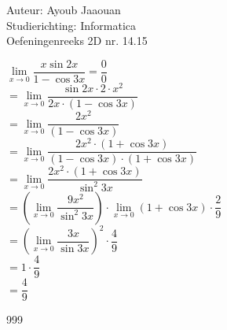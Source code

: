 \documentclass[a4paper]{article}
\begin{document}
\noindent \large Auteur: Ayoub Jaaouan \\
\noindent \large Studierichting: Informatica\\
\noindent \large Oefeningenreeks 2D nr. 14.15\\

\medskip

\normalsize

$\lim\limits_{x \to 0} \dfrac{x\sin 2 x}{1-\cos 3 x} = \dfrac{0}{0}$  \\


$ = \lim\limits_{x \to 0} \dfrac{\sin 2 x \cdot 2 \cdot x^2}{2x \cdot (1-\cos 3x)}$  \\

$ = \lim\limits_{x \to 0} \dfrac{2x^2 }{ (1-\cos 3x)}$  \\

$ = \lim\limits_{x \to 0} \dfrac{2x^2\cdot(1+\cos 3x) }{ (1-\cos 3x)\cdot (1+\cos 3x)}$  \\

$ = \lim\limits_{x \to 0} \dfrac{2x^2\cdot(1+\cos 3x) }{ \sin^2 3x}$  \\

$ = \left(\lim\limits_{x \to 0} \dfrac{9x^2}{\sin^2 3x}\right) \cdot \lim\limits_{x \to 0}  (1+\cos 3x)\cdot\dfrac{2}{9}  $  \\

$ = \left(\lim\limits_{x \to 0} \dfrac{3x}{\sin 3x}\right)^2 \cdot \dfrac{4}{9}  $  \\

$= 1 \cdot\dfrac{4}{9}$  \\

$= \dfrac{4}{9}$  \\


\begin{thebibliography}{999}
\end{thebibliography}
\end{document}
